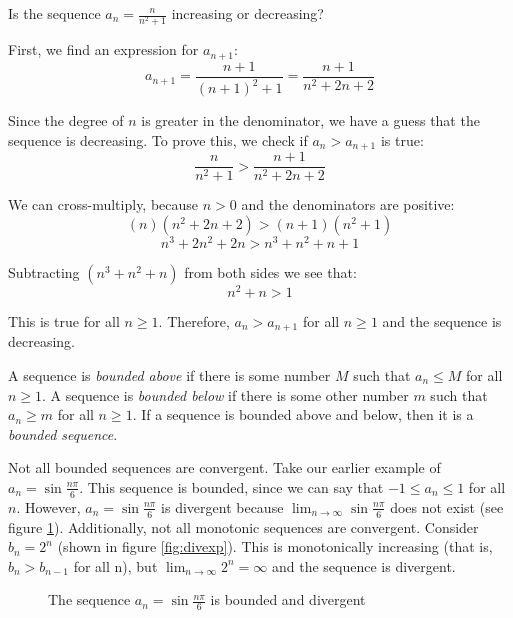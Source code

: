 \begin{Worked}
\begin{Problem}
Is the sequence $a_n = \frac{n}{n^2 + 1}$ increasing or
decreasing?
\end{Problem}
\begin{Solution}
First, we find an expression for $a_{n+1}$:
$$a_{n + 1} = \frac{n + 1}{(n + 1)^2 + 1} = \frac{n + 1}{n^2 + 2n + 2}$$

Since the degree of $n$ is greater in the denominator, we have a guess that
the sequence is decreasing. To prove this, we check if $a_n > a_{n+1}$ is true:
$$\frac{n}{n^2 + 1} > \frac{n + 1}{n^2 + 2n + 2}$$

We can cross-multiply, because $n > 0$ and the denominators are positive:
$$(n)(n^2 + 2n + 2) > (n+1)(n^2 + 1)$$
$$n^3 + 2n^2 + 2n > n^3 + n^2 + n + 1$$

Subtracting $(n^3 + n^2 + n)$ from both sides we see that:
$$n^2 + n > 1$$

This is true for all $n \geq 1$. Therefore, $a_n > a_{n+1}$ for all $n \geq 1$
and the sequence is decreasing.
\end{Solution}
\end{Worked}

A sequence is \textit{bounded above} if there is some number $M$ such that
$a_n \leq M$ for all $n \geq 1$. A sequence is \textit{bounded below} if
there is some other number $m$ such that $a_n \geq m$ for all $n \geq 1$. If a
sequence is bounded above and below, then it is a \textit{bounded sequence}.

Not all bounded sequences are convergent. Take our earlier example of $a_n =
    \sin{\frac{n\pi}{6}}$. This sequence is bounded, since we can say that $- 1
    \leq a_n \leq 1$ for all $n$. However, $a_n = \sin{\frac{n\pi}{6}}$ is
divergent because $\lim_{n \to \infty} \sin{\frac{n\pi}{6}}$ does not exist
(see figure \ref{fig:divsine}). Additionally, not all monotonic sequences are
convergent. Consider $b_n = 2^n$ (shown in figure \ref{fig:divexp}). This is
monotonically increasing (that is, $b_n > b_{n-1}$ for all n), but $\lim_{n \to
        \infty} 2^n = \infty$ and the sequence is divergent.

\begin{figure}
    \centering
    \caption{The sequence $a_n = \sin{\frac{n\pi}{6}}$ is bounded and divergent}
    \label{fig:divsine}
\end{figure}

